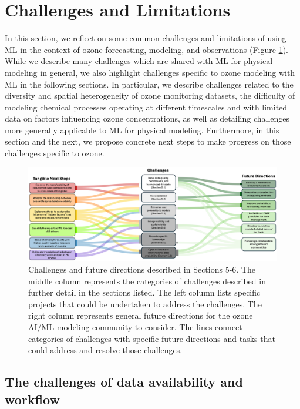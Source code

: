 \documentclass[gmd, manuscript]{copernicus}
\begin{document}

\section{Challenges and Limitations}

In this section, we reflect on some common challenges and limitations of using ML in the context of ozone forecasting, modeling, and observations (Figure \ref{fig:sankey}). While we describe many challenges which are shared with ML for physical modeling in general, we also highlight challenges specific to ozone modeling with ML in the following sections. In particular, we describe challenges related to the diversity and spatial heterogeneity of ozone monitoring datasets, the difficulty of modeling chemical processes operating at different timescales and with limited data on factors influencing ozone concentrations, as well as detailing challenges more generally applicable to ML for physical modeling. Furthermore, in this section and the next, we propose concrete next steps to make progress on those challenges specific to ozone. 

\begin{figure}
    \centering
    \includegraphics[width=0.99\linewidth]{figures/ML4O3_figure_conclusions_20250626.png}
    \caption{Challenges and future directions described in Sections 5-6. The middle column represents the categories of challenges described in further detail in the sections listed. The left column lists specific projects that could be undertaken to address the challenges. The right column represents general future directions for the ozone AI/ML modeling community to consider. The lines connect categories of challenges with specific future directions and tasks that could address and resolve those challenges.}
    \label{fig:sankey}
\end{figure}

\subsection{The challenges of data availability and workflow }
\end{document}
